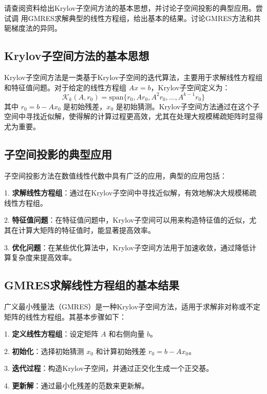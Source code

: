 \documentclass[a4paper]{article}
\begin{document}
请查阅资料给出Krylov子空间方法的基本思想，并讨论子空间投影的典型应用。尝试调
用GMRES求解典型的线性方程组，给出基本的结果。讨论GMRES方法和共轭梯度法的异同。

\subsection{Krylov子空间方法的基本思想}

Krylov子空间方法是一类基于Krylov子空间的迭代算法，主要用于求解线性方程组和特征值问题。对于给定的线性方程组 $Ax = b$，Krylov子空间定义为：
\[
\mathcal{K}_k(A, r_0) = \text{span}\{r_0, Ar_0, A^2r_0, \ldots, A^{k-1}r_0\}
\]
其中 $r_0 = b - Ax_0$ 是初始残差，$x_0$ 是初始猜测。Krylov子空间方法通过在这个子空间中寻找近似解，使得解的计算过程更高效，尤其在处理大规模稀疏矩阵时显得尤为重要。

\subsection{子空间投影的典型应用}

子空间投影方法在数值线性代数中具有广泛的应用，典型的应用包括：

1. \textbf{求解线性方程组}：通过在Krylov子空间中寻找近似解，有效地解决大规模稀疏线性方程组。

2. \textbf{特征值问题}：在特征值问题中，Krylov子空间可以用来构造特征值的近似，尤其在计算大矩阵的特征值时，能显著提高效率。

3. \textbf{优化问题}：在某些优化算法中，Krylov子空间方法用于加速收敛，通过降低计算复杂度来提高效率。

\subsection{GMRES求解线性方程组的基本结果}

广义最小残量法（GMRES）是一种Krylov子空间方法，适用于求解非对称或不定矩阵的线性方程组。其基本步骤如下：

1. \textbf{定义线性方程组}：设定矩阵 $A$ 和右侧向量 $b$。

2. \textbf{初始化}：选择初始猜测 $x_0$ 和计算初始残差 $r_0 = b - Ax_0$。

3. \textbf{迭代过程}：构造Krylov子空间，并通过正交化生成一个正交基。

4. \textbf{更新解}：通过最小化残差的范数来更新解。


\section{}
\end{document}
